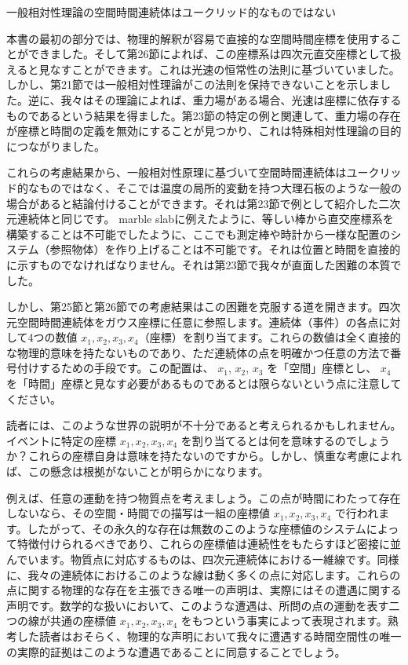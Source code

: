\documentclass[a4paper,11pt,openany]{ltjsbook}
\begin{document}
一般相対性理論の空間時間連続体はユークリッド的なものではない

本書の最初の部分では、物理的解釈が容易で直接的な空間時間座標を使用することができました。そして第26節によれば、この座標系は四次元直交座標として扱えると見なすことができます。これは光速の恒常性の法則に基づいていました。しかし、第21節では一般相対性理論がこの法則を保持できないことを示しました。逆に、我々はその理論によれば、重力場がある場合、光速は座標に依存するものであるという結果を得ました。第23節の特定の例と関連して、重力場の存在が座標と時間の定義を無効にすることが見つかり、これは特殊相対性理論の目的につながりました。

これらの考慮結果から、一般相対性原理に基づいて空間時間連続体はユークリッド的なものではなく、そこでは温度の局所的変動を持つ大理石板のような一般の場合があると結論付けることができます。それは第23節で例として紹介した二次元連続体と同じです。 marble slabに例えたように、等しい棒から直交座標系を構築することは不可能でしたように、ここでも測定棒や時計から一様な配置のシステム（参照物体）を作り上げることは不可能です。それは位置と時間を直接的に示すものでなければなりません。それは第23節で我々が直面した困難の本質でした。

しかし、第25節と第26節での考慮結果はこの困難を克服する道を開きます。四次元空間時間連続体をガウス座標に任意に参照します。連続体（事件）の各点に対して4つの数値 $x_1, x_2, x_3, x_4$（座標）を割り当てます。これらの数値は全く直接的な物理的意味を持たないものであり、ただ連続体の点を明確かつ任意の方法で番号付けするための手段です。この配置は、 $x_{1}$, $x_{2}$, $x_{3}$ を「空間」座標とし、 $x_{4}$ を「時間」座標と見なす必要があるものであるとは限らないという点に注意してください。

読者には、このような世界の説明が不十分であると考えられるかもしれません。イベントに特定の座標 $x_1, x_2, x_3, x_4$ を割り当てるとは何を意味するのでしょうか？これらの座標自身は意味を持たないのですから。しかし、慎重な考慮によれば、この懸念は根拠がないことが明らかになります。

例えば、任意の運動を持つ物質点を考えましょう。この点が時間にわたって存在しないなら、その空間・時間での描写は一組の座標値 $x_1, x_2, x_3, x_4$ で行われます。したがって、その永久的な存在は無数のこのような座標値のシステムによって特徴付けられるべきであり、これらの座標値は連続性をもたらすほど密接に並んでいます。物質点に対応するものは、四次元連続体における一維線です。同様に、我々の連続体におけるこのような線は動く多くの点に対応します。これらの点に関する物理的な存在を主張できる唯一の声明は、実際にはその遭遇に関する声明です。数学的な扱いにおいて、このような遭遇は、所問の点の運動を表す二つの線が共通の座標値 $x_1, x_2, x_3, x_4$ をもつという事実によって表現されます。熟考した読者はおそらく、物理的な声明において我々に遭遇する時間空間性の唯一の実際的証拠はこのような遭遇であることに同意することでしょう。
\end{document}

